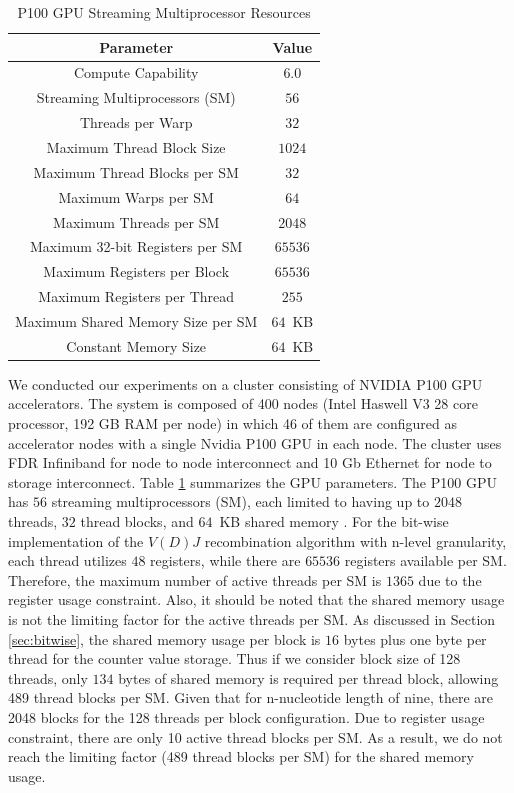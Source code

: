 \begin{table}
\caption{P100 GPU Streaming Multiprocessor Resources}
\renewcommand{\arraystretch}{1.2}
\begin{center}
\begin{tabular}{ |c|c| }
  \hline
    \textbf{Parameter} & \textbf{Value} \\ \hline
    Compute Capability & $6.0$ \\
    Streaming Multiprocessors (SM) & $56$ \\
    Threads per Warp & $32$  \\
    Maximum Thread Block Size & $1024$ \\
    Maximum Thread Blocks per SM & $32$ \\
    Maximum Warps per SM & $64$  \\
    Maximum Threads per SM & $2048$ \\
    Maximum 32-bit Registers per SM & $65536$ \\
    Maximum Registers per Block & $65536$ \\
    Maximum Registers per Thread & $255$ \\
    Maximum Shared Memory Size per SM & $64$~KB \\
    Constant Memory Size & $64$~KB \\
    \hline
\end{tabular}
  \label{tab:P100params}
\end{center}
\end{table}

We conducted our experiments on a cluster consisting of NVIDIA P100 GPU accelerators. The system is composed of 400 nodes (Intel Haswell V3 28 core processor, 192 GB RAM per node) in which 46 of them are configured as accelerator nodes with a single Nvidia P100 GPU in each node. The cluster uses FDR Infiniband for node to node interconnect and 10 Gb Ethernet for node to storage interconnect. Table \ref{tab:P100params} summarizes the GPU parameters. The P100 GPU has $56$ streaming multiprocessors (SM), each limited to having up to $2048$ threads, $32$ thread blocks, and $64$~KB shared memory \cite{b12}. For the bit-wise implementation of the $V(D)J$ recombination algorithm with n-level granularity, each thread utilizes $48$ registers, while there are $65536$ registers available per SM. Therefore, the maximum number of active threads per SM is $1365$ due to the register usage constraint.
Also, it should be noted that the shared memory usage is not the limiting factor for the active threads per SM. As discussed in Section \ref{sec:bitwise}, the shared memory usage per block is $16$ bytes plus one byte per thread for the counter value storage. Thus if we consider block size of 128 threads, only $134$ bytes of shared memory is required per thread block, allowing 489 thread blocks per SM. Given that for n-nucleotide length of nine, there are 2048 blocks for the 128 threads per block configuration. Due to register usage constraint, there are only 10 active thread blocks per SM. As a result, we do not reach the limiting factor (489 thread blocks per SM) for the shared memory usage.

